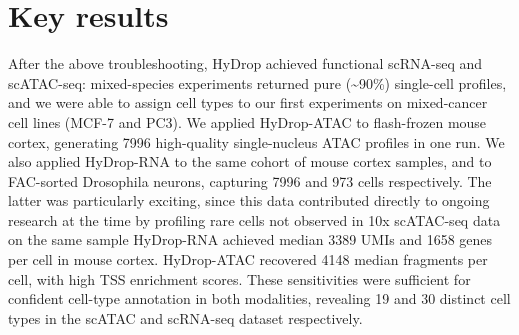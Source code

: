 \section{Key results}
After the above troubleshooting, HyDrop achieved functional scRNA-seq and scATAC-seq: mixed-species experiments returned pure (\textasciitilde{90}\%) single-cell profiles, and we were able to assign cell types to our first experiments on mixed-cancer cell lines (MCF-7 and PC3). We applied HyDrop-ATAC to flash-frozen mouse cortex, generating \num{7996} high-quality single-nucleus ATAC profiles in one run. We also applied HyDrop-RNA to the same cohort of mouse cortex samples, and to FAC-sorted Drosophila neurons, capturing \num{7996} and \num{973} cells respectively. The latter was particularly exciting, since this data contributed directly to ongoing research at the time by profiling rare cells not observed in 10x scATAC-seq data on the same sample HyDrop-RNA achieved median \num{3389} UMIs and \num{1658} genes per cell in mouse cortex. HyDrop-ATAC recovered \num{4148} median fragments per cell, with high TSS enrichment scores. These sensitivities were sufficient for confident cell-type annotation in both modalities, revealing 19 and 30 distinct cell types in the scATAC and scRNA-seq dataset respectively.